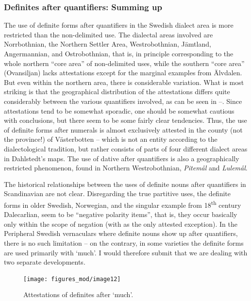 \subsubsection{Definites after quantifiers: Summing up}
The use of definite forms after quantifiers in the Swedish dialect area is more restricted than the non-delimited use. The dialectal areas involved are Norrbothnian, the Northern Settler Area, Westrobothnian, Jämtland, Angermannian, and Ostrobothnian, that is, in principle corresponding to the whole northern “core area” of non-delimited uses, while the southern “core area” (Ovansiljan) lacks attestations except for the marginal examples from Älvdalen. But even within the northern area, there is considerable variation. What is most striking is that the geographical distribution of the attestations differs quite considerably between the various quantifiers involved, as can be seen in --. Since attestations tend to be somewhat sporadic, one should be somewhat cautious with conclusions, but there seem to be some fairly clear tendencies. Thus, the use of definite forms after numerals is almost exclusively attested in the county (not the province!) of Västerbotten – which is not an entity according to the dialectological tradition, but rather consists of parts of four different dialect areas in Dahlstedt’s maps. The use of dative after quantifiers is also a geographically restricted phenomenon, found in Northern Westrobothnian, \textit{Pitemål} and \textit{Lulemål}. 

The historical relationships between the uses of definite nouns after quantifiers in Scandinavian are not clear. Disregarding the true partitive uses, the definite forms in older Swedish, Norwegian, and the singular example from 18\textsuperscript{th} century Dalecarlian, seem to be “negative polarity items”, that is, they occur basically only within the scope of negation (with  as the only attested exception). In the Peripheral Swedish vernaculars where definite nouns show up after quantifiers, there is no such limitation – on the contrary, in some varieties the definite forms are used primarily with ‘much’. I would therefore submit that we are dealing with two separate developments. 

\begin{figure}[h]

\texttt{[image: figures\_mod/image12]}
\caption{Attestations of definites after ‘much’.}
\label{map:12}

\end{figure}

